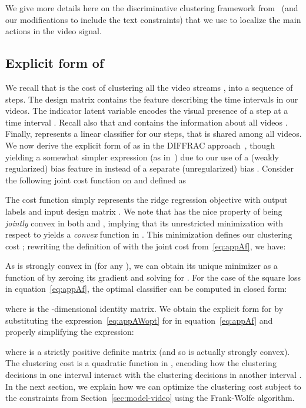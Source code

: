 \documentclass[10pt,twocolumn,letterpaper]{article}
\begin{document}
We give more details here on the discriminative clustering
framework from~\cite{Bojanowski14weakly,Bojanowski15weakly}
(and our modifications to include the text constraints) that we use
to localize the main actions in the video signal.

\subsection{Explicit form of }
\label{subsec:explicit_h}

We recall that  is the cost of clustering all the video streams , into a sequence of  steps. 
The design matrix    contains the feature describing the time intervals in our videos.
The indicator latent variable  encodes the visual presence of a step  at a time interval . 
Recall also that  and  contains the information about all videos .
Finally,  represents a linear classifier for our  steps, that is shared among all videos. We now derive the explicit form of  as in the DIFFRAC approach~\cite{Bach07diffrac}, though yielding a somewhat simpler expression (as in~\cite{Bojanowski15weakly}) due to our use of a (weakly regularized) bias feature in  instead of a separate (unregularized) bias . 
Consider the following joint cost function  on  and  defined as

The cost function  simply represents the ridge regression objective with output labels  and input design matrix . We note that  has the nice property of being \emph{jointly} convex in both  and , implying that its unrestricted minimization with respect to  yields a \emph{convex} function in . This minimization defines our clustering cost ; rewriting the definition of  with the joint cost  from~\eqref{eq:appAf}, we have:

As  is strongly convex in  (for any ), we can obtain its unique minimizer  as a function of  by zeroing its gradient and solving for .
For the case of the square loss in equation~\eqref{eq:appAf}, the optimal classifier  can be computed in closed form:

where  is the -dimensional identity matrix.
We obtain the explicit form for  by substituting the expression~\eqref{eq:appAWopt} for  in equation~\eqref{eq:appAf} and properly simplifying the expression:

where  is a strictly positive definite matrix (and so  is actually strongly convex). The clustering cost is a quadratic function in , encoding how the clustering decisions in one interval  interact with the clustering decisions in another interval . In the next section, we explain how we can optimize the clustering cost  subject to the constraints from Section~\ref{sec:model-video} using the Frank-Wolfe algorithm.
\end{document}
